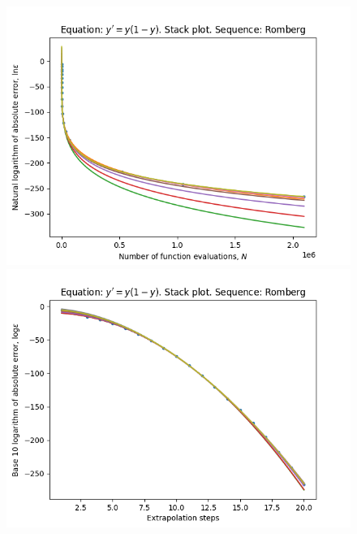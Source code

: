 \begin{figure}[H]
\centering
\begin{minipage}{0.45\textwidth}
\centering
\includegraphics[scale=0.45]{emr_plots/logistic_hp_romberg_stack.png}
\end{minipage}
\begin{minipage}{0.45\textwidth}
\centering
\includegraphics[scale=0.45]{emr_plots/logistic_hp_romberg_steps_stack.png}
\end{minipage}
\end{figure}

